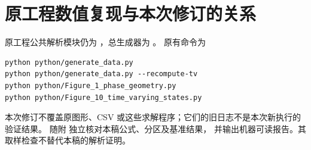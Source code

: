 \documentclass[11pt,a4paper,UTF8]{ctexart}
\theoremstyle{definition}
\begin{document}
\ifdefined\TheoryOnly\else
\section{原工程数值复现与本次修订的关系}
原工程公共解析模块仍为 ，总生成器为 。
原有命令为
\begin{lstlisting}
python python/generate_data.py
python python/generate_data.py --recompute-tv
python python/Figure_1_phase_geometry.py
python python/Figure_10_time_varying_states.py
\end{lstlisting}
本次修订不覆盖原图形、CSV 或这些求解程序；它们的旧日志不是本次新执行的验证结果。
随附  独立核对本稿公式、分区及基准结果，
并输出机器可读报告。其取样检查不替代本稿的解析证明。
\fi


\end{document}
